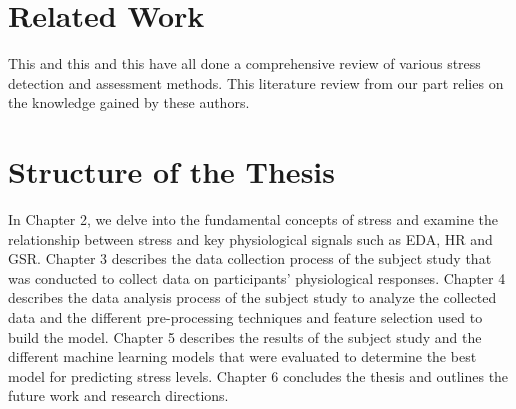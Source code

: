 \section{Related Work}
This and this and this have all done a comprehensive review of various 
stress detection and assessment methods. This literature review from our part relies on the knowledge gained by these authors.



\begin{comment}
subsection*{Physiological indicators of mental stress}
ome studies focus on reviewing the current state of affairs related to human stress detection. For instance, a review on human stress detection using bio-signals is presented in (Giannakakis et al., 2019). However, a discussion about the psychological, physical, and behavioral measures of human stress is found lacking. Further, publicly available databases for human stress measurement were also not explored. In another study, objective, subjective, physical, and behavioral measures for stress detection, as well as publicly available data used for human stress, are discussed. Another application-specific human stress measurement survey focusing on driver stress level is presented in (Rastgoo et al., 2018). Physical and physiological measures o

Mental Stress Detection using Data from Wearable and Non-Wearable Sensors: A Review 5 human stress for driver stress detection are explored in detail. The limitation of this survey is that it only discusses a specific application i.e., driver stress level, and is not generic.

\subsection*{Robots and stress}
\end{comment}


\section{Structure of the Thesis}
  In Chapter 2, we delve into the fundamental concepts of stress and examine the relationship between stress and key physiological signals such as \gls{EDA}, \gls{HR} and \gls{GSR}. Chapter 3 describes the data collection process of the subject study that was conducted to collect data on participants' physiological responses. Chapter 4 describes the data analysis process of the subject study  to analyze the collected data and the different pre-processing techniques and feature selection used to build the model. Chapter 5 describes the results of the subject study and the different machine learning models that were evaluated to determine the best model for predicting stress levels. Chapter 6 concludes the thesis and outlines the future work and research directions.
  

  
 
 